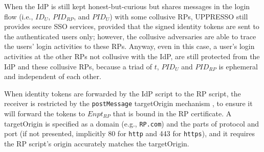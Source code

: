 


\vspace{0.5mm}
When the IdP is still kept honest-but-curious but shares messages in the login flow (i.e.,
$ID_U$, $PID_{RP}$, and $PID_U$)
        with some collusive RPs,
UPPRESSO still provides secure SSO services,
    provided that the signed identity tokens are sent to the authenticated users only;
however,
    the collusive adversaries are able to trace the users' login activities to these RPs.
Anyway, even in this case, a user's login activities at the other RPs not collusive with the IdP,
        are still protected from the IdP and these collusive RPs,
        because a triad of $t$, $PID_U$ and $PID_{RP}$ is ephemeral and independent of each other.


\vspace{0.5mm}
When identity tokens are forwarded by the IdP script to the RP script, %
    the receiver is restricted by the \verb+postMessage+ targetOrigin mechanism \cite{postm-targeto},
        to ensure it will forward the tokens to $Enpt_{RP}$
        that is bound in the RP certificate.
A targetOrigin is specified as
    a domain (e.g., \verb+RP.com+) and the parts of protocol and port (if not presented, implicitly 80 for \verb+http+ and 443 for \verb+https+),
        and it requires the RP script's origin accurately matches the targetOrigin.

